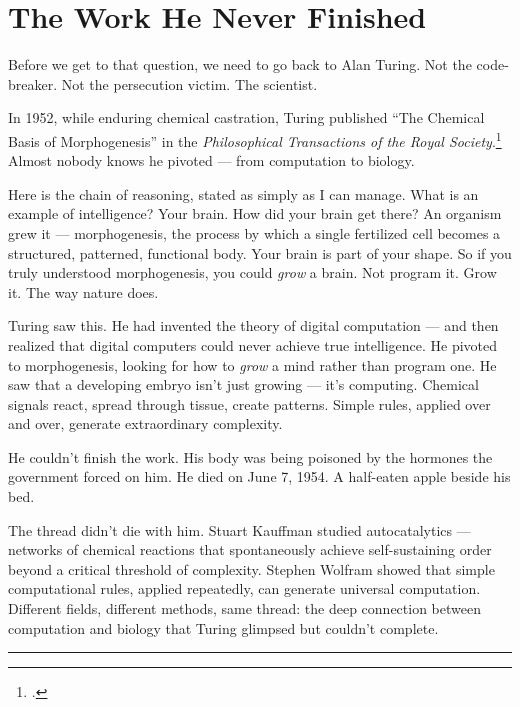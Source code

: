 \section*{The Work He Never Finished}
\label{pos04:the-work-he-never-finished}

Before we get to that question, we need to go back to Alan Turing. Not the code-breaker. Not the persecution victim. The scientist.

In 1952, while enduring chemical castration, Turing published ``The Chemical Basis of Morphogenesis'' in the \textit{Philosophical Transactions of the Royal Society}.\footcite{turing1952} Almost nobody knows he pivoted --- from computation to biology.

Here is the chain of reasoning, stated as simply as I can manage. What is an example of intelligence? Your brain. How did your brain get there? An organism grew it --- \gls{morphogenesis}, the process by which a single fertilized cell becomes a structured, patterned, functional body. Your brain is part of your shape. So if you truly understood morphogenesis, you could \textit{grow} a brain. Not program it. Grow it. The way nature does.

Turing saw this. He had invented the theory of digital computation --- and then realized that digital computers could never achieve true intelligence. He pivoted to morphogenesis, looking for how to \textit{grow} a mind rather than program one. He saw that a developing embryo isn't just growing --- it's computing. Chemical signals react, spread through tissue, create patterns. Simple rules, applied over and over, generate extraordinary complexity.

He couldn't finish the work. His body was being poisoned by the hormones the government forced on him. He died on June 7, 1954. A half-eaten apple beside his bed.

The thread didn't die with him. Stuart Kauffman studied \glspl{autocatalytic} --- networks of chemical reactions that spontaneously achieve self-sustaining order beyond a critical threshold of complexity. Stephen Wolfram showed that simple computational rules, applied repeatedly, can generate universal computation. Different fields, different methods, same thread: the deep connection between computation and biology that Turing glimpsed but couldn't complete.

\vspace{1cm}\noindent\rule{0.5\textwidth}{0.5pt}\vspace{0.5cm}

